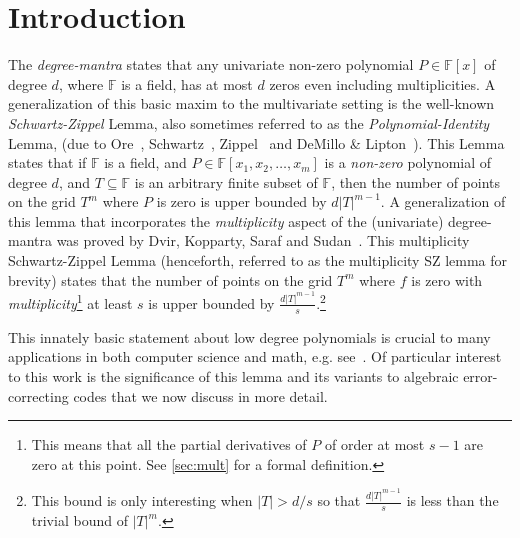 \documentclass{theoretics}
\def\Field{\mathbb{F}}
\let\F\Field
\begin{document}
	\section{Introduction}
	The \emph{degree-mantra} states that any univariate non-zero
	polynomial $P \in \F[x]$ of degree $d$, where $\F$ is a field, has at
	most $d$ zeros even including multiplicities. A generalization of this
	basic maxim to the multivariate setting is the well-known
	\emph{Schwartz-Zippel} Lemma, also sometimes referred to as the
	\emph{Polynomial-Identity} Lemma, (due to Ore~\cite{Ore1922},
	Schwartz~\cite{Schwartz1980}, Zippel~\cite{Zippel1979} and DeMillo \&
	Lipton~\cite{DemilloL1978}). This Lemma states that if $\F$ is a
	field, and $P \in \F[x_1, x_2, \ldots, x_m]$ is a \emph{non-zero}
	polynomial of degree $d$, and $T\subseteq \F$ is an arbitrary finite
	subset of $\F$, then the number of points on the grid $T^m$ where $P$
	is zero is upper bounded by $d|T|^{m-1}$. A generalization of this lemma that incorporates the
	\emph{multiplicity} aspect of the (univariate) degree-mantra was proved
	by Dvir, Kopparty, Saraf and Sudan~\cite{DvirKSS2013}. This
	multiplicity Schwartz-Zippel Lemma (henceforth, referred to as the
	multiplicity SZ lemma for brevity) states that the number
	of points on the grid $T^m$ where $f$ is zero with
	\emph{multiplicity}\footnote{This means that all the partial
		derivatives of $P$ of order at most $s-1$ are zero at this
		point. See \cref{sec:mult} for a formal definition.} at least
	$s$ is upper bounded by $\frac{d|T|^{m-1}}{s}$.\footnote{This bound is
		only interesting when $|T| > d/s$ so that $\frac{d|T|^{m-1}}{s}$ is
		less than the trivial bound of $|T|^{m}$.}
	
	This innately basic statement about low degree polynomials is crucial to many applications in both computer science and math, e.g. see~\cite{Guth2016}. Of particular interest to this work is the significance of this lemma and its variants to algebraic error-correcting codes that we now discuss in more detail.   
	
\end{document}
